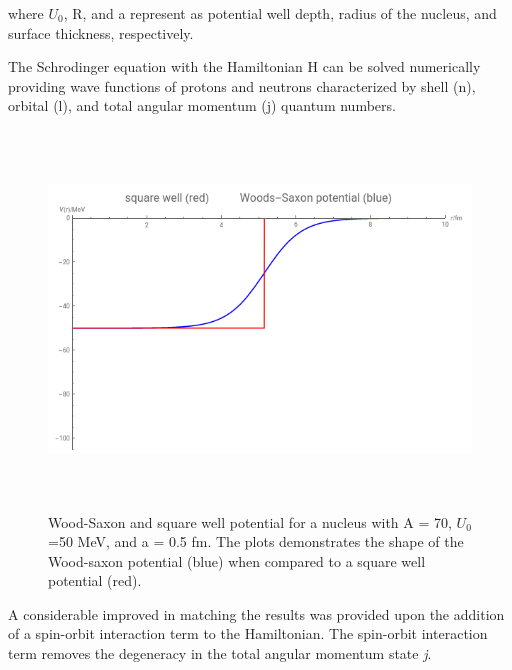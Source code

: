 where $U_{0}$, R, and a represent as potential well depth, radius of the nucleus, and surface thickness, respectively.

The Schrodinger equation with the Hamiltonian H can be solved numerically providing wave functions of protons and neutrons characterized by shell (n), orbital (l), and total angular momentum (j) quantum numbers.


\begin{figure}[h!]
	\centering
	\includegraphics[width=12cm,height=10cm]{figures/Wood_sxaon.png}
	\caption[Wood-Saxon and square well potential for a nucleus with A = 70, $U_{0}$=50 MeV, and a = 0.5 fm.]{Wood-Saxon and square well potential for a nucleus with A = 70, $U_{0}$=50 MeV, and a = 0.5 fm. The plots demonstrates the shape of the Wood-saxon potential (blue) when compared to a square well potential (red). }
	\label{fig:woods_saxon}
\end{figure}
A considerable improved in matching the results was provided upon the addition of a spin-orbit interaction term to the Hamiltonian. The spin-orbit interaction term removes the degeneracy in the total angular momentum state \textit{j}. 


